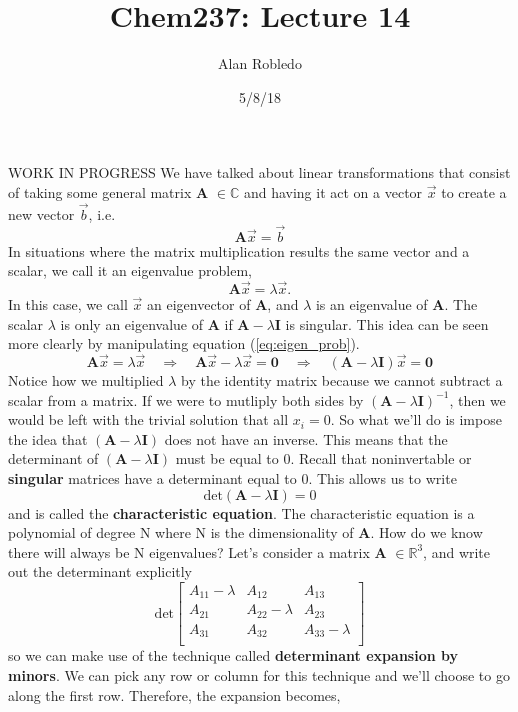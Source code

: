 \documentclass{article}
\title{Chem237: Lecture 14}
\date{5/8/18}
\author{Alan Robledo}
\newcommand{\be}{\begin{equation}}
\newcommand{\ee}{\end{equation}}
\begin{document}
\maketitle
WORK IN PROGRESS
We have talked about linear transformations that consist of taking some general matrix \textbf{A} $\in \mathbb{C}$ and having it act on a vector $\vec{x}$ to create a new vector $\vec{b}$, i.e.
\be
  \textbf{A} \vec{x} = \vec{b}
\ee
In situations where the matrix multiplication results the same vector and a scalar, we call it an eigenvalue problem,
\be \label{eq:eigen_prob}
  \textbf{A} \vec{x} = \lambda \vec{x} .
\ee
In this case, we call $\vec{x}$ an eigenvector of \textbf{A}, and $\lambda$ is an eigenvalue of \textbf{A}.
The scalar $\lambda$ is only an eigenvalue of \textbf{A} if $\textbf{A} - \lambda \textbf{I}$ is singular.
This idea can be seen more clearly by manipulating equation (\ref{eq:eigen_prob}).
\be
  \textbf{A} \vec{x} = \lambda \vec{x} \quad \Longrightarrow \quad \textbf{A} \vec{x} - \lambda \vec{x} = \textbf{0} \quad \Longrightarrow \quad (\textbf{A} - \lambda \textbf{I})\vec{x} = \textbf{0}
\ee
Notice how we multiplied $\lambda$ by the identity matrix because we cannot subtract a scalar from a matrix.
If we were to mutliply both sides by $(\textbf{A} - \lambda \textbf{I})^{-1}$, then we would be left with the trivial solution that all $x_i = 0$.
So what we'll do is impose the idea that $(\textbf{A} - \lambda \textbf{I})$ does not have an inverse.
This means that the determinant of $(\textbf{A} - \lambda \textbf{I})$ must be equal to 0.
Recall that noninvertable or \textbf{singular} matrices have a determinant equal to 0.
This allows us to write
\be
  \text{det}(\textbf{A} - \lambda \textbf{I}) = 0
\ee
and is called the \textbf{characteristic equation}.
The characteristic equation is a polynomial of degree N where N is the dimensionality of \textbf{A}.
How do we know there will always be N eigenvalues?
Let's consider a matrix \textbf{A} $\in \mathbb{R}^3$, and write out the determinant explicitly
\be
  \text{det}
  \begin{bmatrix}
    A_{11} - \lambda  & A_{12} & A_{13} \\
    A_{21} & A_{22} - \lambda & A_{23} \\
    A_{31} & A_{32} & A_{33} - \lambda \\
  \end{bmatrix}
\ee
so we can make use of the technique called \textbf{determinant expansion by minors}.
We can pick any row or column for this technique and we'll choose to go along the first row.
Therefore, the expansion becomes,
\end{document}
